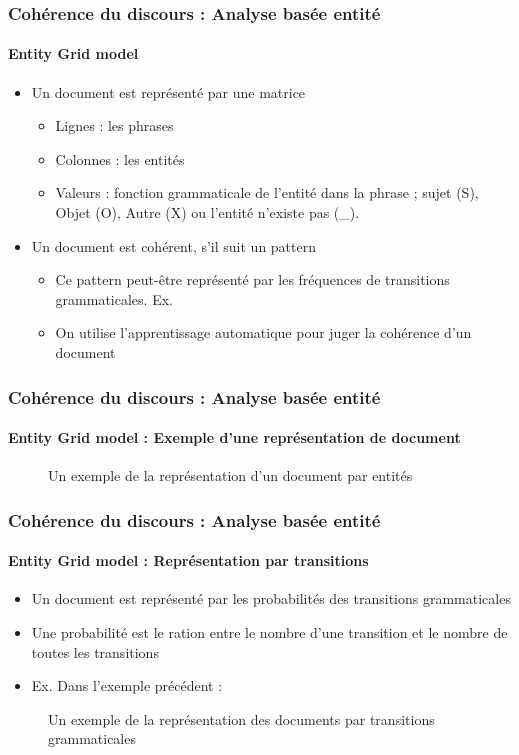\documentclass[xcolor=table]{beamer}
\begin{document}
\begin{frame}
	\frametitle{Cohérence du discours : Analyse basée entité}
	\framesubtitle{Entity Grid model}
	
	\begin{itemize}
		\item Un document est représenté par une matrice
		\begin{itemize}
			\item Lignes : les phrases 
			\item Colonnes : les entités
			\item Valeurs : fonction grammaticale de l'entité dans la phrase ; sujet (S), Objet (O), Autre (X) ou l'entité n'existe pas (\_).
		\end{itemize}
		\item Un document est cohérent, s'il suit un pattern
		\begin{itemize}
			\item Ce pattern peut-être représenté par les fréquences de transitions grammaticales. Ex. 
			\item On utilise l'apprentissage automatique pour juger la cohérence d'un document
		\end{itemize}
		
	\end{itemize}
	
\end{frame}

\begin{frame}
	\frametitle{Cohérence du discours : Analyse basée entité}
	\framesubtitle{Entity Grid model : Exemple d'une représentation de document}
	
	\begin{figure}
		
		\caption{Un exemple de la représentation d'un document par entités \cite{2008-barzilay-lapata}}
	\end{figure}
	
\end{frame}

\begin{frame}
	\frametitle{Cohérence du discours : Analyse basée entité}
	\framesubtitle{Entity Grid model : Représentation par transitions}
	
	\begin{itemize}
		\item Un document est représenté par les probabilités des transitions grammaticales
		\item Une probabilité est le ration entre le nombre d'une transition et le nombre de toutes les transitions
		\item Ex. Dans l'exemple précédent : 
	\end{itemize}
	\begin{figure}
		\caption{Un exemple de la représentation des documents par transitions grammaticales \cite{2008-barzilay-lapata}}
	\end{figure}
	
\end{frame}
\end{document}
